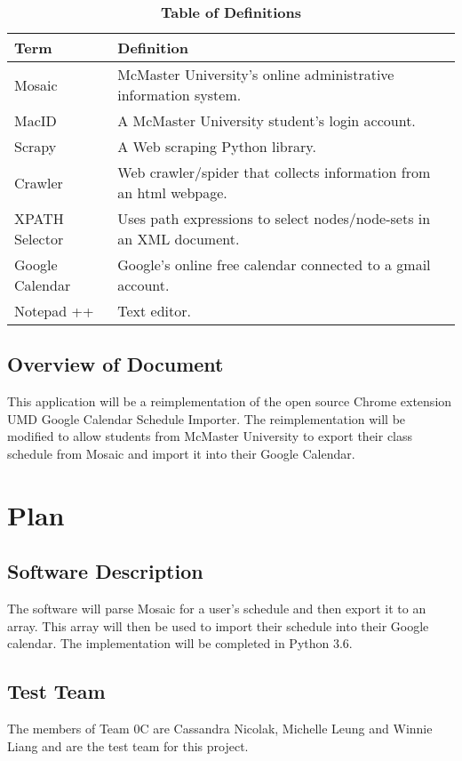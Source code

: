 \documentclass[12pt, titlepage]{article}
\begin{document}
\begin{table}[!htbp]
\caption{\textbf{Table of Definitions}} \label{Table}

\begin{tabularx}{\textwidth}{p{3cm}X}
\toprule
\textbf{Term} & \textbf{Definition}\\
\midrule
Mosaic & McMaster University's online administrative information system.\\
MacID & A McMaster University student's login account.\\
Scrapy & A Web scraping Python library.\\
Crawler & Web crawler/spider that collects information from an html webpage.\\
XPATH Selector & Uses path expressions to select nodes/node-sets in an XML document. \\
Google Calendar & Google’s online free calendar connected to a gmail account.\\
Notepad ++ & Text editor.\\
\bottomrule
\end{tabularx}

\end{table}	

\subsection{Overview of Document}
This application will be a reimplementation of the open source Chrome extension UMD Google Calendar Schedule Importer. The reimplementation will be modified to allow students from McMaster University to export their class schedule from Mosaic and import it into their Google Calendar.
\section{Plan}
	
\subsection{Software Description}
The software will parse Mosaic for a user's schedule and then export it to an array. This array will then be used to import their schedule into their Google calendar. The implementation will be completed in Python 3.6.

\subsection{Test Team}
The members of Team 0C are Cassandra Nicolak, Michelle Leung and Winnie Liang and are the test team for this project.
\end{document}
